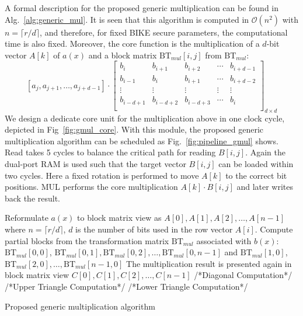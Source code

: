 \documentclass[runningheads]{llncs}
\begin{document}
A formal description for the proposed generic multiplication can be found in Alg.~\ref{alg:generic_mul}. It is seen that this algorithm is computed in $\mathcal{O}(n^2)$ with $n=\lceil r/d\rceil$, and therefore, for fixed BIKE secure parameters, the computational time is also fixed.  
Moreover, the core function is the multiplication of a $d$-bit vector $A[k]$ of $a(x)$ and a block matrix $\text{BT}_{mul}$$[i,j]$ from $\text{BT}_{mul}$:
\[
    [a_j,a_{j+1},\ldots,a_{j+d-1}]\cdot
\left[ \begin{array}{ccccc}
b_{i}&b_{i+1}&b_{i+2}&\cdots &b_{i+d-1} \\
b_{i-1}&b_{i}&b_{i+1}&\cdots &b_{i+d-2} \\
\vdots&\vdots&\vdots&\vdots&\vdots\\
b_{i-d+1}&b_{i-d+2}&b_{i-d+3}&\cdots &b_{i} \\
\end{array}
\right ]_{d\times d}
\]
We design a dedicate core unit for the multiplication above in one clock cycle, depicted in Fig~\ref{fig:gmul_core}. With this module, the proposed generic multiplication algorithm can be scheduled as Fig.~\ref{fig:pipeline_gmul} shows. Read takes 5 cycles to balance the critical path for reading $B[i,j]$. Again the dual-port RAM is used such that the target vector $B[i,j]$ can be loaded within two cycles. Here a fixed rotation is performed to move $A[k]$ to the correct bit positions. MUL performs the core multiplication $A[k]\cdot B[i,j]$ and later writes back the result.

\begin{algorithm}[!tbh]
 \DontPrintSemicolon %
    Reformulate $a(x)$ to block matrix view as $A[0],A[1],A[2],\ldots, A[n-1]$ where $n=\lceil r/d \rceil$, $d$ is the number of bits used in the row vector $A[i]$.\;
    Compute partial blocks from the transformation matrix $\text{BT}_{mul}$ associated with $b(x)$: $\text{BT}_{mul}[0,0]$, $\text{BT}_{mul}[0,1],\text{BT}_{mul}[0,2],\ldots,\text{BT}_{mul}[0,n-1]$ and $\text{BT}_{mul}[1,0]$, $\text{BT}_{mul}[2,0],\ldots,\text{BT}_{mul}[n-1,0]$\;
    The multiplication result is presented again in block matrix view $C[0],C[1],C[2],\ldots, C[n-1]$\;
    /*Diagonal Computation*/\;
    /*Upper Triangle Computation*/\;
    /*Lower Triangle Computation*/\;
 \caption{Proposed generic multiplication algorithm}\label{alg:generic_mul}
\end{algorithm}
\end{document}
